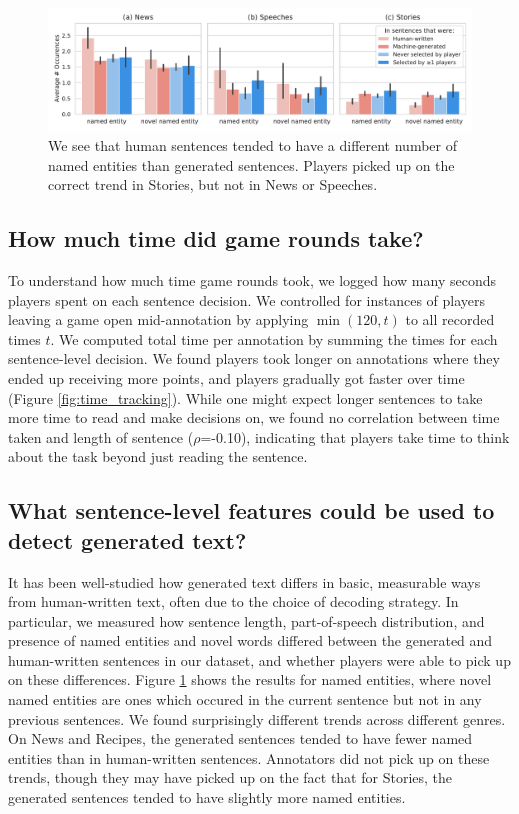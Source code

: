 \begin{figure}[tb]
    \centering
    \includegraphics[width=0.8\linewidth]{figures/ner_stats.pdf}
    \caption{We see that human sentences tended to have a different number of named entities than generated sentences.
    Players picked up on the correct trend in Stories, but not in News or Speeches.}
    \label{fig:sentence_stats}
\end{figure}

\subsection{How much time did game rounds take?}
To understand how much time game rounds took, we logged how many seconds players spent on each sentence decision.
We controlled for instances of players leaving a game open mid-annotation by applying $\min(120, t)$ to all recorded times $t$.
We computed total time per annotation by summing the times for each sentence-level decision.
We found players took longer on annotations where they ended up receiving more points, and players gradually got faster over time (Figure \ref{fig:time_tracking}).
While one might expect longer sentences to take more time to read and make decisions on, we found no correlation between time taken and length of sentence ($\rho$=-0.10), indicating that players take time to think about the task beyond just reading the sentence.

\subsection{What sentence-level features could be used to detect generated text?}
It has been well-studied how generated text differs in basic, measurable ways from human-written text, often due to the choice of decoding strategy.
In particular, we measured how sentence length, part-of-speech distribution, and presence of named entities and novel words differed between the generated and human-written sentences in our dataset, and whether players were able to pick up on these differences.
Figure \ref{fig:sentence_stats} shows the results for named entities, where novel named entities are ones which occured in the current sentence but not in any previous sentences.
We found surprisingly different trends across different genres.
On News and Recipes, the generated sentences tended to have fewer named entities than in human-written sentences.
Annotators did not pick up on these trends, though they may have picked up on the fact that for Stories, the generated sentences tended to have slightly more named entities.

